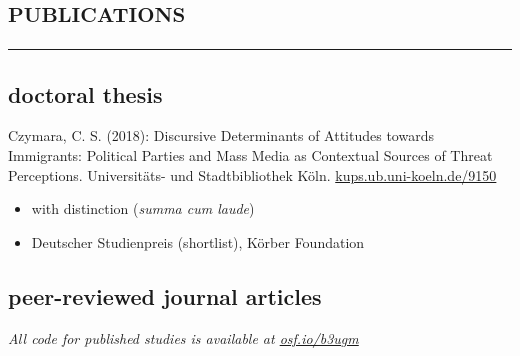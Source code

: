 \documentclass[11pt, a4paper]{article}
\begin{document}
\section*{\textsc{publications}}
\vskip-20pt{\noindent\rule{\textwidth}{1pt}}
\subsection*{doctoral thesis}
Czymara, C. S. (2018): Discursive Determinants of Attitudes towards Immigrants: Political Parties and Mass Media as Contextual Sources of Threat Perceptions. Universitäts- und Stadtbibliothek Köln. \href{https://kups.ub.uni-koeln.de/9150}{kups.ub.uni-koeln.de/9150}
\begin{itemize}
	\item with distinction (\textit{summa cum laude})
	\item Deutscher Studienpreis (shortlist), Körber Foundation
\end{itemize}
\hspace{1em}
\subsection*{peer-reviewed journal articles}
\textit{All code for published studies is available at \href{https://osf.io/b3ugm}{osf.io/b3ugm}}\\
\end{document}
